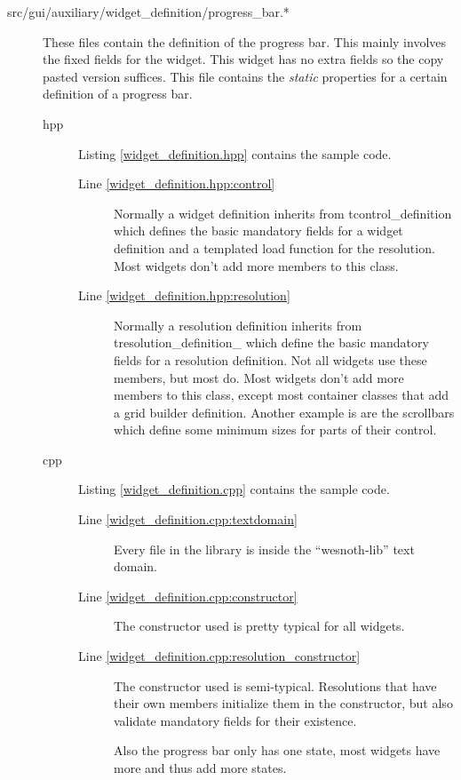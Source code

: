 \begin{description}

\item[src/gui/auxiliary/widget\_definition/progress\_bar.*]
	These files contain the definition of the progress bar. This mainly involves
	the fixed fields for the widget. This widget has no extra fields so the copy
	pasted version suffices. This file contains the \emph{static} properties for
	a certain definition of a progress bar.

\begin{description}
\item[hpp] Listing \ref{widget_definition.hpp} contains the sample code. 
	\begin{description}
	\item[Line \ref{widget_definition.hpp:control}] Normally a
		widget definition inherits from tcontrol\_definition which defines the
		basic mandatory fields for a widget definition and a templated load
		function for the resolution. Most widgets don't add more members to this
		class.
	\item[Line \ref{widget_definition.hpp:resolution}] Normally a resolution
		definition inherits from tresolution\_definition\_ which define the
		basic mandatory fields for a resolution definition. Not all widgets use
		these members, but most do. Most widgets don't add more members to this
		class, except most container classes that add a grid builder
		definition. Another example is are the scrollbars which define some
		minimum sizes for parts of their control.
	\end{description}

\item[cpp] Listing \ref{widget_definition.cpp} contains the sample code. 
	\begin{description}
	\item[Line \ref{widget_definition.cpp:textdomain}] Every file in the library
		is inside the ``wesnoth-lib'' text domain.
	\item[Line \ref{widget_definition.cpp:constructor}] The constructor used is
		pretty typical for all widgets.
	\item[Line \ref{widget_definition.cpp:resolution_constructor}] The
		constructor used is semi-typical. Resolutions that have their own
		members initialize them in the constructor, but also validate mandatory
		fields for their existence.

		Also the progress bar only has one state, most widgets have more and
		thus add more states.


\end{description}
\end{description}
\end{description}
